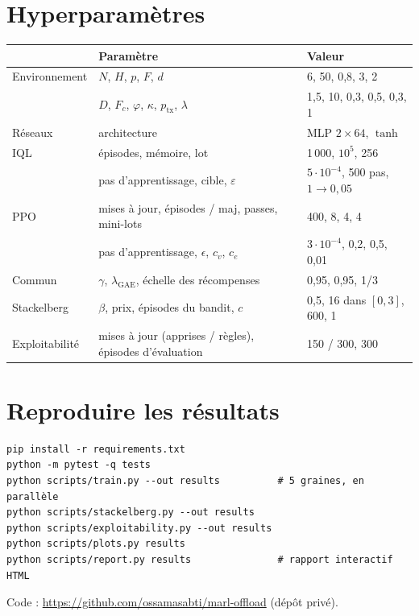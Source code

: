 \documentclass[11pt,a4paper]{article}
\begin{document}
\appendix
\section{Hyperparamètres}

\begin{center}\small
\begin{tabular}{lll}
\toprule
 & Paramètre & Valeur \\
\midrule
Environnement & $N$, $H$, $p$, $F$, $d$ & 6, 50, 0,8, 3, 2 \\
              & $D$, $F_c$, $\varphi$, $\kappa$, $p_{\mathrm{tx}}$, $\lambda$ & 1,5, 10, 0,3, 0,5, 0,3, 1 \\
Réseaux       & architecture & MLP $2\times64$, $\tanh$ \\
IQL           & épisodes, mémoire, lot & 1\,000, $10^5$, 256 \\
              & pas d'apprentissage, cible, $\varepsilon$ & $5\cdot10^{-4}$, 500 pas, $1\to0{,}05$ \\
PPO           & mises à jour, épisodes / maj, passes, mini-lots & 400, 8, 4, 4 \\
              & pas d'apprentissage, $\epsilon$, $c_v$, $c_e$ & $3\cdot10^{-4}$, 0,2, 0,5, 0,01 \\
Commun        & $\gamma$, $\lambda_{\text{GAE}}$, échelle des récompenses & 0,95, 0,95, 1/3 \\
Stackelberg   & $\beta$, prix, épisodes du bandit, $c$ & 0,5, 16 dans $[0,3]$, 600, 1 \\
Exploitabilité & mises à jour (apprises / règles), épisodes d'évaluation & 150 / 300, 300 \\
\bottomrule
\end{tabular}
\end{center}

\section{Reproduire les résultats}

\begin{verbatim}
pip install -r requirements.txt
python -m pytest -q tests
python scripts/train.py --out results          # 5 graines, en parallèle
python scripts/stackelberg.py --out results
python scripts/exploitability.py --out results
python scripts/plots.py results
python scripts/report.py results               # rapport interactif HTML
\end{verbatim}

\noindent Code : \url{https://github.com/ossamasabti/marl-offload} (dépôt privé).
\end{document}

